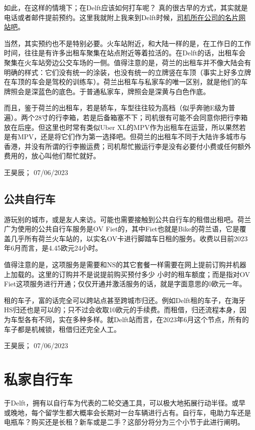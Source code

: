 如此，在这样的情境下；在Delft应该如何打车呢？ 真的很古早的方式，其实就是电话或者邮件提前预约。这里我就附上我来到Delft时候，\href{https://taxidelfland.nl/}{\uline{司机所在公司的名片网站吧}}。

当然，其实预约也不是特别必要。火车站附近，和大陆一样的是，在工作日的工作时间，往往是有许多出租车聚集在站点附近等着拉活的。在Delft的话，出租车会聚集在火车站旁边公交车场的一侧。值得注意的是，荷兰的出租车并不像大陆会有明确的样式：它们没有统一的涂装，也没有统一的立牌竖在车顶（事实上好多立牌在车顶的车会是驾校的训练车）。荷兰出租车与私家车的唯一区别，就是他们的车牌照会是深蓝色的底色。于普通私家车，牌照会是深黄与白色作底。

而且，鉴于荷兰的出租车，若是轿车，车型往往较为高档（似乎奔驰E级为普遍）。两个28寸的行李箱，若是后备箱塞不下；司机很有可能不会同意你把行李箱放在后座。但这里也时常有类似Uber XL的MPV作为出租车在运营，所以果然若是有MPV，还是将它们作为第一选择吧。但荷兰的出租车不同于大陆许多城市与香港，并没有所谓的行李搬运费；司机帮忙搬运行李是没有必要付小费或任何额外费用的，放心叫他们帮忙就好。
\begin{flushright}
王昊辰； 07/06/2023
\end{flushright}

\subsection{公共自行车}
游玩别的城市，或是友人来访。可能也需要接触到公共自行车的租借出租吧。荷兰广为使用的公共自行车服务是OV Fiet的，其中Fiet也就是Bike的荷兰语，它是覆盖几乎所有荷兰火车站的，以实名OV卡进行脚踏车日租的服务。收费以目前2023年6月而言，是4.45欧元24小时。

值得注意的是，这项服务是需要和NS的其它套餐一样需要在网上提前订购并机器上加载的。这里的订购并不是说提前购买预付多少
小时的租车额度；而是指对OV Fiet这项服务进行开通；仅仅开通并激活服务的话，就是字面意思的0欧元一年。

租的车子，富的话完全可以跨站点甚至跨城市归还。例如Delft租的车子，在海牙HS归还也是可以的；只不过会收取10欧元的手续费。而租借，归还流程本身，因为车型各有不同，实在多种多样。就Delft站而言，在2023年6月这个节点，所有的车子都是机械锁，租借归还完全人工。
\begin{flushright}
王昊辰； 07/06/2023
\end{flushright}
\vspace{\betsubsec} %
\section{私家自行车}
于Delft，拥有以自行车为代表的二轮交通工具，可以极大地拓展行动半径。或早或晚地，每个留学生都大概率会长期对一台车辆进行占有。自行车，电助力车还是电瓶车？购买还是长租？新车或是二手？这部分将分为三个小节于此进行阐明。

